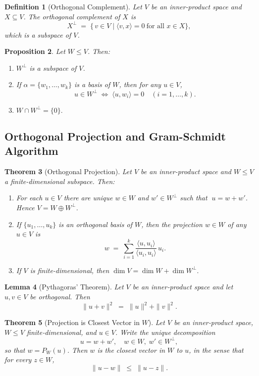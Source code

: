 \documentclass[12pt]{article}
\theoremstyle{break}             %
\newtheorem{thm}{Theorem}          %
\newtheorem{prop}[thm]{Proposition}%
\newtheorem{lem}[thm]{Lemma}
\newtheorem{defn}[thm]{Definition}
\begin{document}
\begin{defn}[Orthogonal Complement]
Let \(V\) be an inner‐product space and \(X\subseteq V\).  The \emph{orthogonal complement} of \(X\) is
\[
X^{\perp}
\;=\;
\{\,v\in V \mid \langle v,x\rangle = 0 \ \text{for all }x\in X\},
\]
which is a subspace of \(V\).
\end{defn}

\begin{prop}
Let \(W\le V\).  Then:
\begin{enumerate}
  \item \(W^\perp\) is a subspace of \(V\).
  \item If \(\alpha=\{w_1,\dots,w_k\}\) is a basis of \(W\), then for any \(u\in V\),
  \[
    u\in W^\perp
    \;\Longleftrightarrow\;
    \langle u,w_i\rangle = 0\quad (i=1,\dots,k).
  \]
  \item \(W\cap W^\perp = \{0\}.\)
\end{enumerate}
\end{prop}

\subsection{Orthogonal Projection and Gram-Schmidt Algorithm}

\begin{thm}[Orthogonal Projection]
Let \(V\) be an inner-product space and \(W\le V\) a finite-dimensional subspace.  Then:
\begin{enumerate}
  \item For each \(u\in V\) there are unique \(w\in W\) and \(w'\in W^\perp\) such that 
  \(\;u = w + w'\).  Hence \(V = W\oplus W^\perp\).
  \item If \(\{u_1,\dots,u_k\}\) is an orthogonal basis of \(W\), then the projection \(w\in W\) of any \(u\in V\) is
  \[
    w \;=\; \sum_{i=1}^k \frac{\langle u,u_i\rangle}{\langle u_i,u_i\rangle}\,u_i.
  \]
  \item If \(V\) is finite-dimensional, then 
  \(\dim V = \dim W + \dim W^\perp.\)
\end{enumerate}
\end{thm}

\begin{lem}[Pythagoras’ Theorem]
Let \(V\) be an inner‐product space and let \(u,v\in V\) be orthogonal.  Then
\[
\|u+v\|^2 \;=\;\|u\|^2 + \|v\|^2.
\]
\end{lem}

\begin{thm}[Projection is Closest Vector in $W$]
Let \(V\) be an inner‐product space, \(W\le V\) finite‐dimensional, and \(u\in V\).  Write the unique decomposition
\[
u = w + w',\quad w\in W,\;w'\in W^\perp,
\]
so that \(w = P_W(u)\).  Then \(w\) is the closest vector in \(W\) to \(u\), in the sense that for every \(z\in W\),
\[
\|u - w\|\;\le\;\|u - z\|.
\]
\end{thm}
\end{document}
